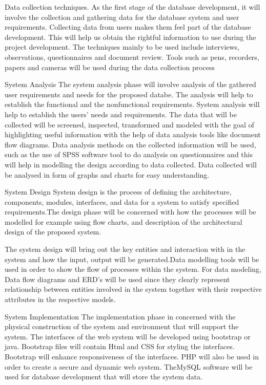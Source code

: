 \documentclass[11pt]{report}
\begin{document}
Data collection techniques.
As the first stage of the database development, it will involve the collection and gathering data for the  database system and user requirements. Collecting data from users makes them feel part of the database  development. This will help us obtain the rightful information to use during the project development. The techniques mainly to be used include interviews, observations, questionnaires and document review. Tools such as pens, recorders, papers and cameras will be used during the data collection process

System Analysis
The system analysis phase will involve analysis of the gathered user requirements and needs for the proposed  databe. The analysis will help to establish the functional and the nonfunctional requirements. System analysis will help to establish the users’ needs and requirements.
The data that will be collected will be screened, inspected, transformed and modeled with the goal of highlighting useful information with the help of data analysis tools like document flow diagrams. Data analysis methods on the collected information will be used, such as the use of SPSS software tool to do analysis on questionnaires and this will help in modelling the design according to data collected. Data collected will be analysed in form of graphs and charts for easy understanding.

System Design
System design is the process of defining the architecture, components, modules, interfaces, and data for a system to satisfy specified requirements.The design phase will be concerned with how the processes will be modelled for example using flow charts, and description of the architectural design of the proposed system.

The system design will bring out the key entities and interaction with in the system and how the input, output will be generated.Data modelling tools will be used in order to show the flow of processes within the system. For data modeling, Data flow diagrams and ERD's will be used since they clearly represent relationship between entities involved in the system together with their respective attributes in the respective models. 


System Implementation
The implementation phase in concerned with the physical construction of the system and environment that will support the system.
The interfaces of the web system will be developed using bootstrap or java. Bootstrap files will contain Html and CSS for styling the interfaces. Bootstrap will enhance responsiveness of the interfaces. 
PHP will also be used in order to create a secure and dynamic web system. TheMySQL software will be used for database development that will store the system data. 
\end{document}
